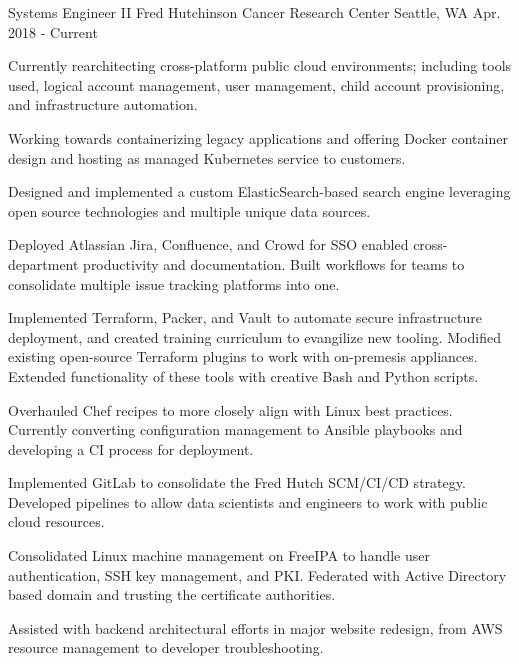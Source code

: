 


\begin{cventries}

\cventry
{Systems Engineer II} %
{Fred Hutchinson Cancer Research Center} %
{Seattle, WA} %
{Apr. 2018 - Current} %
{ %
\begin{cvitems}
\item {Currently rearchitecting cross-platform public cloud environments; including tools used, logical account management, user management, child account provisioning, and infrastructure automation.}
\item {Working towards containerizing legacy applications and offering Docker container design and hosting as managed Kubernetes service to customers.}
\item {Designed and implemented a custom ElasticSearch-based search engine leveraging open source technologies and multiple unique data sources.}
\item {Deployed Atlassian Jira, Confluence, and Crowd for SSO enabled cross-department productivity and documentation. Built workflows for teams to consolidate multiple issue tracking platforms into one. }
\item {Implemented Terraform, Packer, and Vault to automate secure infrastructure deployment, and created training curriculum to evangilize new tooling. Modified existing open-source Terraform plugins to work with on-premesis appliances. Extended functionality of these tools with creative Bash and Python scripts.}
\item {Overhauled Chef recipes to more closely align with Linux best practices. Currently converting configuration management to Ansible playbooks and developing a CI process for deployment.}
\item {Implemented GitLab to consolidate the Fred Hutch SCM/CI/CD strategy. Developed pipelines to allow data scientists and engineers to work with public cloud resources.}
\item {Consolidated Linux machine management on FreeIPA to handle user authentication, SSH key management, and PKI. Federated with Active Directory based domain and trusting the certificate authorities. }
\item {Assisted with backend architectural efforts in major website redesign, from AWS resource management to developer troubleshooting.}
\end{cvitems}
}


\end{cventries}
